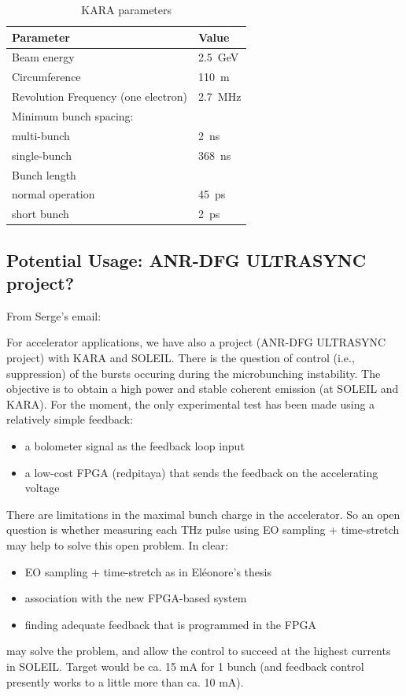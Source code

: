 \begin{table}[tbh]
	\caption{KARA parameters \cite{rota2018}}
	\label{tab:kara}
	\centering
	\begin{tabularx}{0.7\textwidth}{Xl}
		\toprule
		\textbf{Parameter} & \textbf{Value} \\
		\midrule
		Beam energy    							&  \SI{2.5}{\giga \electronvolt} \\
		Circumference 	 						& \SI{110}{\meter}	  \\
		Revolution Frequency (one electron)   	& \SI{2.7}{\mega \hertz} 	\\
		Minimum bunch spacing:					& 	\\
		\quad multi-bunch 						& \SI{2}{\nano \second} \\
		\quad single-bunch 						& \SI{368}{\nano \second}	\\
		Bunch length							& \\
		\quad normal operation					& \SI{45}{\pico \second} \\
		\quad short bunch						& \SI{2}{\pico \second} \\
		\bottomrule		
	\end{tabularx}
\end{table}

\subsection{Potential Usage: ANR-DFG ULTRASYNC project?}
From Serge's email:

For accelerator applications, we have also a project (ANR-DFG ULTRASYNC project) with KARA and SOLEIL.
There is the question of control (i.e., suppression) of the bursts occuring during the microbunching instability. The objective is to obtain a high power and stable coherent emission (at SOLEIL and KARA). For the moment, the only experimental test has been made using a relatively simple feedback:
\begin{itemize}
	\item a bolometer signal as the feedback loop input
	\item a low-cost FPGA (redpitaya) that sends the feedback on the accelerating voltage
\end{itemize}

There are limitations in the maximal bunch charge in the accelerator. So an open question is whether measuring each THz pulse using EO sampling + time-stretch may help to solve this open problem. In clear:

\begin{itemize}
	\item EO sampling + time-stretch as in Eléonore's thesis
	\item association with the new FPGA-based system
	\item finding adequate feedback that is programmed in the FPGA
\end{itemize}
may solve the problem, and allow the control to succeed at the highest currents in SOLEIL. 
Target would be ca. 15 mA for 1 bunch (and feedback control presently works to a little more than ca. 10 mA).

